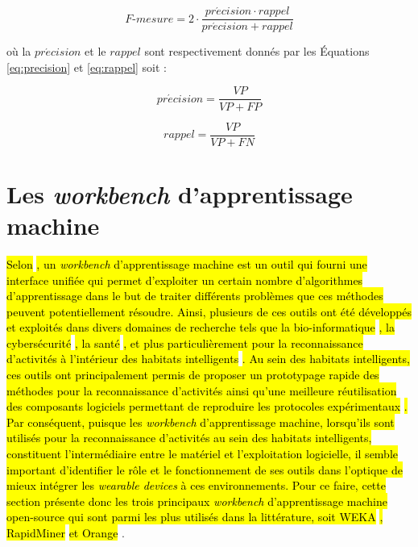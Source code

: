 \begin{equation}
	\label{eq:f-score}
	F\mbox{-} mesure = 2 \cdot \frac{pr\acute{e}cision \cdot rappel}{pr\acute{e}cision + rappel}
\end{equation}

\noindent où la $pr\acute{e}cision$ et le $rappel$ sont respectivement donnés par les Équations \ref{eq:precision} et \ref{eq:rappel} soit :

\begin{equation}
	\label{eq:precision}
	pr\acute{e}cision = \frac{VP}{VP+FP}
\end{equation}

\begin{equation}
	\label{eq:rappel}
	rappel = \frac{VP}{VP+FN}
\end{equation}

\section{Les \textit{workbench} d'apprentissage machine}

\hl{Selon} \cite{Langlois2008}\hl{, un \textit{workbench} d'apprentissage machine est un outil qui fourni une interface unifiée qui permet d'exploiter un certain nombre d'algorithmes d'apprentissage dans le but de traiter différents problèmes que ces méthodes peuvent potentiellement résoudre. Ainsi, plusieurs de ces outils ont été développés et exploités dans divers domaines de recherche tels que la bio-informatique} \citep{Larranaga2006}\hl{, la cybersécurité} \citep{Handa2019}\hl{, la santé} \citep{Rajkomar2019}\hl{, et plus particulièrement pour la reconnaissance d'activités à l'intérieur des habitats intelligents} \citep{Chapron2018,Ramirez-Prado2019}\hl{. Au sein des habitats intelligents, ces outils ont principalement permis de proposer un prototypage rapide des méthodes pour la reconnaissance d'activités ainsi qu'une meilleure réutilisation des composants logiciels permettant de reproduire les protocoles expérimentaux} \citep{Langlois2008}\hl{. Par conséquent, puisque les \textit{workbench} d'apprentissage machine, lorsqu'ils sont utilisés pour la reconnaissance d'activités au sein des habitats intelligents, constituent l'intermédiaire entre le matériel et l'exploitation logicielle, il semble important d'identifier le rôle et le fonctionnement de ses outils dans l'optique de mieux intégrer les \textit{wearable devices} à ces environnements. Pour ce faire, cette section présente donc les trois principaux \textit{workbench} d'apprentissage machine open-source qui sont parmi les plus utilisés dans la littérature, soit WEKA} \citep{Holmes1994}\hl{, RapidMiner} \citep{Ritthoo2003,Hofmann2014} \hl{et Orange} \citep{Demsar2004,Demsar2013}.

